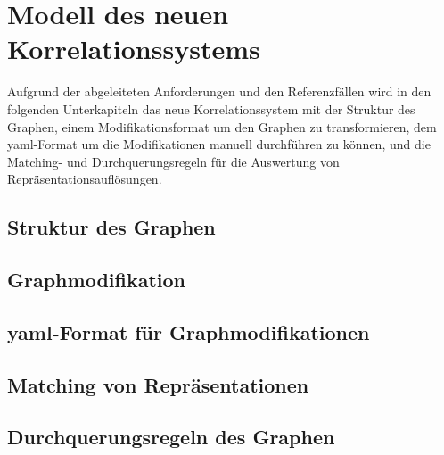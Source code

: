 \section{Modell des neuen Korrelationssystems}\label{sec:model-modellierungsansatz}

Aufgrund der abgeleiteten Anforderungen und den Referenzfällen wird in den folgenden Unterkapiteln das neue Korrelationssystem mit der Struktur des Graphen, einem Modifikationsformat um den Graphen zu transformieren, dem \acrshort{yaml}-Format um die Modifikationen manuell durchführen zu können, und die Matching- und Durchquerungsregeln für die Auswertung von Repräsentationsauflösungen.

\subsection{Struktur des Graphen}\label{subsec:model-graph-struktur}

\subsection{Graphmodifikation}\label{subsec:model-graph-modification}

\subsection{\acrshort{yaml}-Format für Graphmodifikationen}\label{subsec:modell-graph-modification-yaml}

\subsection{Matching von Repräsentationen}\label{subsec:model-matching}

\subsection{Durchquerungsregeln des Graphen}\label{subsec:model-traversal}
